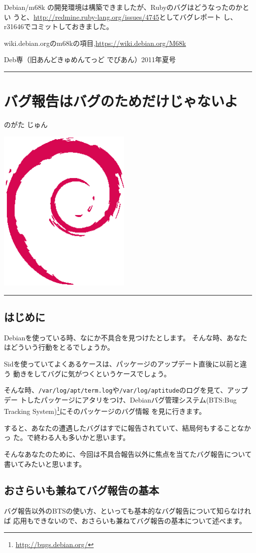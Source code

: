 \documentclass[mingoth,a4paper]{jsarticle}
\renewcommand{\dancersection}[2]{%
\newpage
Deb専（旧あんどきゅめんてっど でびあん）2011年夏号
%
\vspace{0.1mm}\\
{\color{dancerdarkblue}\rule{\hsize}{2mm}}

%
%
\begin{minipage}[t]{0.6\hsize}
\color{dancerdarkblue}
\vspace{1cm}
\section{#1}
\hfill{}#2\\
\end{minipage}
\begin{minipage}[t]{0.4\hsize}
\vspace{-2cm}
\hfill{}\includegraphics[height=8cm]{image200502/openlogo-nd.eps}\\
\vspace{-5cm}
\end{minipage}
%
{\color{dancerlightblue}\rule{0.66\hsize}{2mm}}
%
\vspace{2cm}
}
\begin{document}
Debian/m68k の開発環境は構築できましたが、Rubyのバグはどうなったのかとい
うと、\url{http://redmine.ruby-lang.org/issues/4745}としてバグレポート
し、r31646でコミットしておきました。


\begin{thebibliography}{}
  wiki.debian.orgのm68kの項目,\url{https://wiki.debian.org/M68k}
\end{thebibliography}

\dancersection{バグ報告はバグのためだけじゃないよ}{のがた じゅん}

\subsection{はじめに}

Debianを使っている時、なにか不具合を見つけたとします。
そんな時、あなたはどういう行動をとるでしょうか。

Sidを使っていてよくあるケースは、パッケージのアップデート直後に以前と違う
動きをしてバグに気がつくというケースでしょう。

そんな時、\texttt{/var/log/apt/term.log}や\texttt{/var/log/aptitude}のログを見て、アップデー
トしたパッケージにアタリをつけ、Debianバグ管理システム(BTS:Bug Tracking
System)\footnote{\url{http://bugs.debian.org/}}にそのパッケージのバグ情報
を見に行きます。

すると、あなたの遭遇したバグはすでに報告されていて、結局何もすることなかっ
た。で終わる人も多いかと思います。

そんなあなたのために、今回は不具合報告以外に焦点を当てたバグ報告について
書いてみたいと思います。

\subsection{おさらいも兼ねてバグ報告の基本}

バグ報告以外のBTSの使い方、といっても基本的なバグ報告について知らなければ
応用もできないので、おさらいも兼ねてバグ報告の基本について述べます。
\end{document}
